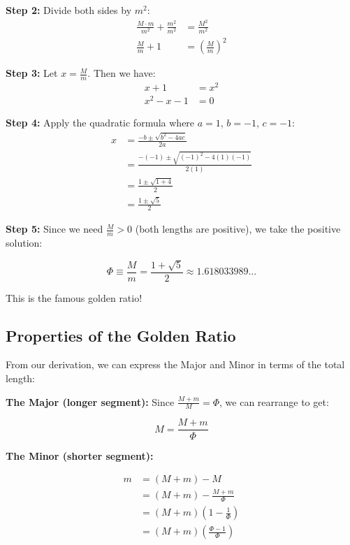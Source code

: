 \documentclass[12pt,a4paper]{article}
\begin{document}
\textbf{Step 2:} Divide both sides by $m^2$:
\begin{align}
  \frac{M \cdot m}{m^2} + \frac{m^2}{m^2} &= \frac{M^2}{m^2} \\
  \frac{M}{m} + 1 &= \left(\frac{M}{m}\right)^2
\end{align}

\textbf{Step 3:} Let $x = \frac{M}{m}$. Then we have:
\begin{align}
  x + 1 &= x^2 \\
  x^2 - x - 1 &= 0
\end{align}

\pagebreak

\textbf{Step 4:} Apply the quadratic formula where $a=1$, $b=-1$, $c=-1$:
\begin{align}
  x &= \frac{-b \pm \sqrt{b^2 - 4ac}}{2a} \\
  &= \frac{-(-1) \pm \sqrt{(-1)^2 - 4(1)(-1)}}{2(1)} \\
  &= \frac{1 \pm \sqrt{1 + 4}}{2} \\
  &= \frac{1 \pm \sqrt{5}}{2}
\end{align}

\textbf{Step 5:} Since we need $\frac{M}{m} > 0$ (both lengths are positive), we take the positive solution:

\begin{equation}
  \Phi \equiv \frac{M}{m} = \frac{1 + \sqrt{5}}{2} \approx 1.618033989...
  \label{Phi}
\end{equation}

This is the famous golden ratio!

\subsection{Properties of the Golden Ratio}

From our derivation, we can express the Major and Minor in terms of the total length:

\textbf{The Major (longer segment):}
Since $\frac{M+m}{M} = \Phi$, we can rearrange to get:

\begin{equation}
  M = \frac{M + m}{\Phi}
  \label{Major}
\end{equation}

\textbf{The Minor (shorter segment):}

\begin{align}
  m &= (M + m) - M \\
  &= (M + m) - \frac{M + m}{\Phi} \\
  &= (M + m)\left(1 - \frac{1}{\Phi}\right) \\
  &= (M + m)\left(\frac{\Phi - 1}{\Phi}\right)
  \label{Minor}
\end{align}
\end{document}
